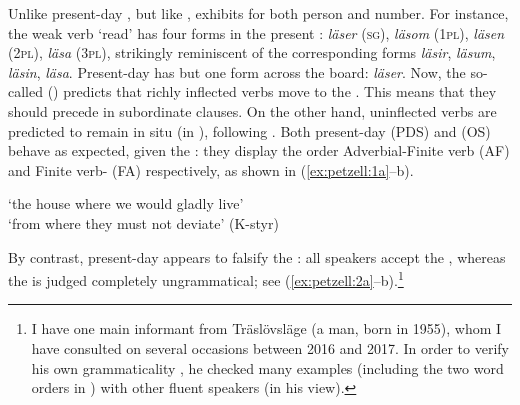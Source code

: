 \documentclass[output=paper,colorlinks,citecolor=brown,draft,draftmode]{langscibook}
\begin{document}
Unlike present-day , but like ,  exhibits  for both person and number. For instance, the weak verb ‘read’ has four forms in the present : \textit{läser} (\textsc{sg}), \textit{läsom} (1\textsc{pl}), \textit{läsen} (2\textsc{pl}), \textit{läsa} (3\textsc{pl}), strikingly reminiscent of the corresponding  forms \textit{läsir}, \textit{läsum}, \textit{läsin}, \textit{läsa}. Present-day  has but one form across the board: \textit{läser}. Now, the so-called  () predicts that richly inflected verbs move to the . This means that they should precede  in subordinate clauses. On the other hand, uninflected verbs are predicted to remain {in situ} (in ), following . Both present-day  (PDS) and  (OS) behave as expected, given the : they display the order Adverbial-Finite verb (AF) and Finite verb- (FA) respectively, as shown in (\ref{ex:petzell:1a}–b).


\ea\label{ex:petzell:1}
\glt `the house where we would gladly live’  \\
\glt `from where they must not deviate’ (K-styr)
\z
\z


By contrast, present-day  appears to falsify the : all speakers accept the , whereas the  is judged completely ungrammatical; see (\ref{ex:petzell:2a}–b).\footnote{I have one main informant from Träslövsläge (a man, born in 1955), whom I have consulted on several occasions between 2016 and 2017. In order to verify his own grammaticality , he checked many examples (including the two word orders in ) with other fluent  speakers (in his view).}
\end{document}
